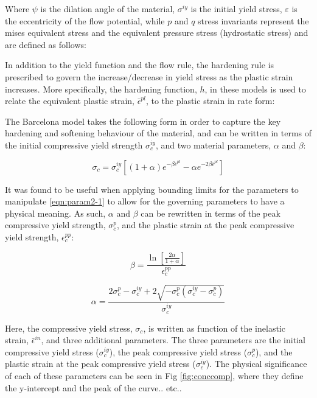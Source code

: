 Where $\psi$ is the dilation angle of the material, $\sigma^{iy}$ is the initial yield stress, $\varepsilon$ is the eccentricity of the flow potential, while $p$ and $q$ stress invariants represent the mises equivalent stress and the equivalent pressure stress (hydrostatic stress) and are defined as follows:


In addition to the yield function and the flow rule, the hardening rule is prescribed to govern the increase/decrease in yield stress as the plastic strain increases. More specifically, the hardening function, $h$, in these models is used to relate the equivalent plastic strain, $\bar{\epsilon}^{pl}$,  to the plastic strain in rate form: 

The Barcelona model takes the following form in order to capture the key hardening and softening behaviour of the material, and can be written in terms of the initial compressive yield strength $\sigma_c^{iy}$, and two material parameters, $\alpha$ and $\beta$:

\begin{equation}
\sigma_c=\sigma_c^{iy}\left [ \left ( 1+\alpha \right ) e^{-\beta\bar{\epsilon}^{pl}}-\alpha e^{-2\beta\bar{\epsilon}^{pl}}  \right ]
\label{eqn:param2-1}
\end{equation}

It was found to be useful when applying bounding limits for the parameters to manipulate \ref{eqn:param2-1} to allow for the governing parameters to have a physical meaning. As such, $\alpha$ and $\beta$ can be rewritten in terms of the peak compressive yield strength, $\sigma_{c}^{p}$, and the plastic strain at the peak compressive yield strength, $\epsilon_c^{pp}$:

\begin{equation}
\beta=\frac{\ln\left[\frac{2\alpha}{1+\alpha} \right ]}{\epsilon_c^{pp}}
\label{eqn:param2-2}
\end{equation}

\begin{equation}
\alpha =\frac{2\sigma_c^{p}-\sigma_c^{iy}+2\sqrt{-\sigma_c^p\left(\sigma_c^{iy}-\sigma_c^p \right )}}{\sigma_c^{iy}}
\label{eqn:param2-3}
\end{equation}

Here, the compressive yield stress, $\sigma_{c}$, is written as function
of the inelastic strain, $\bar{\epsilon}^{in}$, and three additional
parameters. The three parameters are the initial compressive yield
stress ($\sigma_{c}^{iy}$), the peak compressive yield stress ($\sigma_{c}^{p}$),
and the plastic strain at the peak compressive yield stress ($\sigma_{c}^{iy}$).
The physical significance of each of these parameters can be seen
in Fig \ref{fig:conccomp}, where they define the y-intercept and the peak of the curve..
etc..

